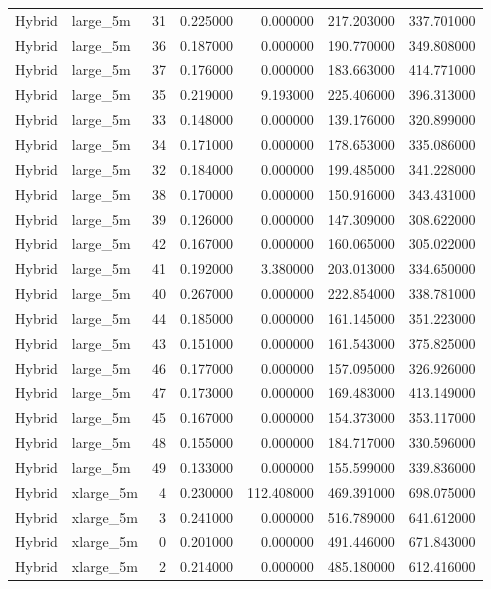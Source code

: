 \begin{tabular}{llrrrrr}
Hybrid & large_5m & 31 & 0.225000 & 0.000000 & 217.203000 & 337.701000 \\
Hybrid & large_5m & 36 & 0.187000 & 0.000000 & 190.770000 & 349.808000 \\
Hybrid & large_5m & 37 & 0.176000 & 0.000000 & 183.663000 & 414.771000 \\
Hybrid & large_5m & 35 & 0.219000 & 9.193000 & 225.406000 & 396.313000 \\
Hybrid & large_5m & 33 & 0.148000 & 0.000000 & 139.176000 & 320.899000 \\
Hybrid & large_5m & 34 & 0.171000 & 0.000000 & 178.653000 & 335.086000 \\
Hybrid & large_5m & 32 & 0.184000 & 0.000000 & 199.485000 & 341.228000 \\
Hybrid & large_5m & 38 & 0.170000 & 0.000000 & 150.916000 & 343.431000 \\
Hybrid & large_5m & 39 & 0.126000 & 0.000000 & 147.309000 & 308.622000 \\
Hybrid & large_5m & 42 & 0.167000 & 0.000000 & 160.065000 & 305.022000 \\
Hybrid & large_5m & 41 & 0.192000 & 3.380000 & 203.013000 & 334.650000 \\
Hybrid & large_5m & 40 & 0.267000 & 0.000000 & 222.854000 & 338.781000 \\
Hybrid & large_5m & 44 & 0.185000 & 0.000000 & 161.145000 & 351.223000 \\
Hybrid & large_5m & 43 & 0.151000 & 0.000000 & 161.543000 & 375.825000 \\
Hybrid & large_5m & 46 & 0.177000 & 0.000000 & 157.095000 & 326.926000 \\
Hybrid & large_5m & 47 & 0.173000 & 0.000000 & 169.483000 & 413.149000 \\
Hybrid & large_5m & 45 & 0.167000 & 0.000000 & 154.373000 & 353.117000 \\
Hybrid & large_5m & 48 & 0.155000 & 0.000000 & 184.717000 & 330.596000 \\
Hybrid & large_5m & 49 & 0.133000 & 0.000000 & 155.599000 & 339.836000 \\
Hybrid & xlarge_5m & 4 & 0.230000 & 112.408000 & 469.391000 & 698.075000 \\
Hybrid & xlarge_5m & 3 & 0.241000 & 0.000000 & 516.789000 & 641.612000 \\
Hybrid & xlarge_5m & 0 & 0.201000 & 0.000000 & 491.446000 & 671.843000 \\
Hybrid & xlarge_5m & 2 & 0.214000 & 0.000000 & 485.180000 & 612.416000 \\

\end{tabular}
